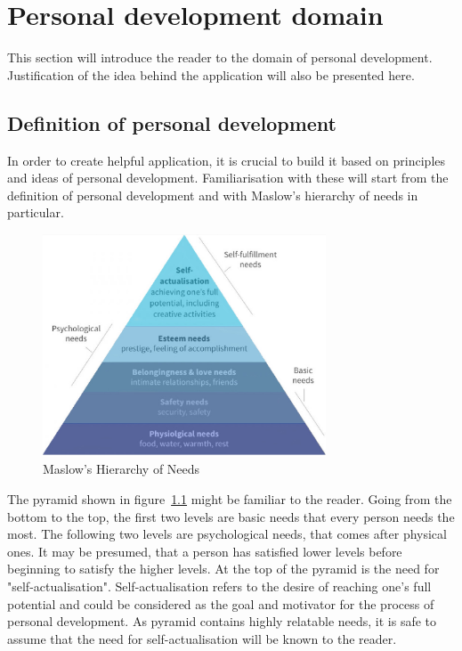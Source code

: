 

\chapter{Personal development domain}\label{ch:personal-development-domain}


This section will introduce the reader to the domain of personal development.
Justification of the idea behind the application will also be presented here.



\section{Definition of personal development}\label{sec:definition-of-personal-development}

In order to create helpful application, it is crucial to build it based on principles and ideas of personal development.
Familiarisation with these will start from the definition of personal development and with Maslow's hierarchy of needs in particular.

\begin{figure}[h]
    \includegraphics[width=0.75\textwidth]{images/maslows.jpg}
    \caption{Maslow's Hierarchy of Needs~\cite{maslows}}
    \label{fig:maslows}
\end{figure}

The pyramid shown in figure~\ref{fig:maslows} might be familiar to the reader.
Going from the bottom to the top, the first two levels are basic needs that every person needs the most.
The following two levels are psychological needs, that comes after physical ones.
It may be presumed, that a person has satisfied lower levels before beginning to satisfy the higher levels.
At the top of the pyramid is the need for "self-actualisation".
Self-actualisation refers to the desire of reaching one's full potential and could be considered as the goal and motivator for the process of personal development.
As pyramid contains highly relatable needs, it is safe to assume that the need for self-actualisation will be known to the reader.

